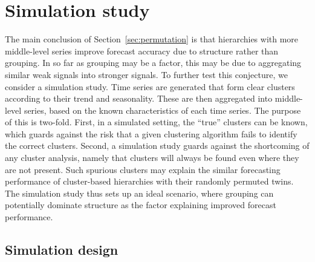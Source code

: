 \documentclass[a4paper,review,12pt,authoryear]{elsarticle}
\begin{document}
\section{Simulation study}
\label{sec:simulation}
The main conclusion of Section~\ref{sec:permutation} is that hierarchies with more middle-level series improve forecast accuracy due to structure rather than grouping. In so far as grouping may be a factor, this may be due to aggregating similar weak signals into stronger signals. To further test this conjecture, we consider a simulation study. Time series are generated that form clear clusters according to their trend and seasonality. These are then aggregated into middle-level series, based on the known characteristics of each time series. The purpose of this is two-fold. First, in a simulated setting, the ``true'' clusters can be known, which guards against the risk that a given clustering algorithm fails to identify the correct clusters. Second, a simulation study guards against the shortcoming of any cluster analysis, namely that clusters will always be found even where they are not present. Such spurious clusters may explain the similar forecasting performance of cluster-based hierarchies with their randomly permuted twins. The simulation study thus sets up an ideal scenario, where grouping can potentially dominate structure as the factor explaining improved forecast performance.





\subsection{Simulation design}
\end{document}
